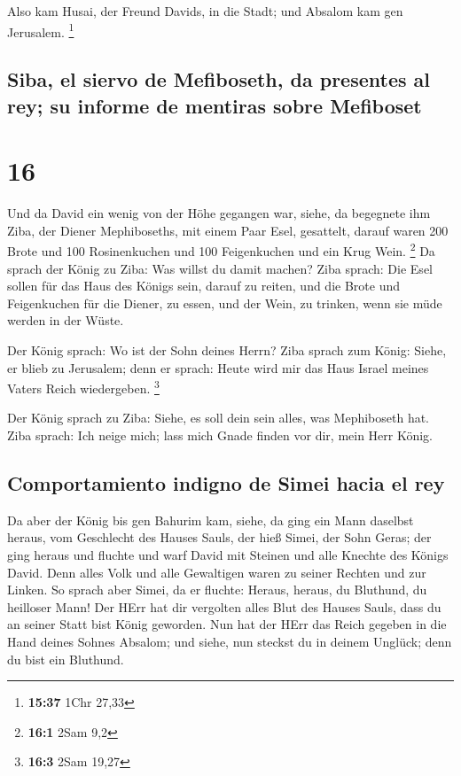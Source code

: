  Also kam Husai, der Freund Davids, in die Stadt; und
Absalom kam gen Jerusalem. \footnote{\textbf{15:37} 1Chr 27,33}

\hypertarget{siba-el-siervo-de-mefiboseth-da-presentes-al-rey-su-informe-de-mentiras-sobre-mefiboset}{%
\subsection{Siba, el siervo de Mefiboseth, da presentes al rey; su
informe de mentiras sobre
Mefiboset}\label{siba-el-siervo-de-mefiboseth-da-presentes-al-rey-su-informe-de-mentiras-sobre-mefiboset}}

\hypertarget{section-15}{%
\section{16}\label{section-15}}

 Und da David ein wenig von der Höhe gegangen war, siehe,
da begegnete ihm Ziba, der Diener Mephiboseths, mit einem Paar Esel,
gesattelt, darauf waren 200 Brote und 100 Rosinenkuchen und 100
Feigenkuchen und ein Krug Wein. \footnote{\textbf{16:1} 2Sam 9,2}
 Da sprach der König zu Ziba: Was willst du damit machen?
Ziba sprach: Die Esel sollen für das Haus des Königs sein, darauf zu
reiten, und die Brote und Feigenkuchen für die Diener, zu essen, und der
Wein, zu trinken, wenn sie müde werden in der Wüste.

 Der König sprach: Wo ist der Sohn deines Herrn? Ziba
sprach zum König: Siehe, er blieb zu Jerusalem; denn er sprach: Heute
wird mir das Haus Israel meines Vaters Reich wiedergeben. \footnote{\textbf{16:3}
  2Sam 19,27}

 Der König sprach zu Ziba: Siehe, es soll dein sein alles,
was Mephiboseth hat. Ziba sprach: Ich neige mich; lass mich Gnade finden
vor dir, mein Herr König.

\hypertarget{comportamiento-indigno-de-simei-hacia-el-rey}{%
\subsection{Comportamiento indigno de Simei hacia el
rey}\label{comportamiento-indigno-de-simei-hacia-el-rey}}

 Da aber der König bis gen Bahurim kam, siehe, da ging ein
Mann daselbst heraus, vom Geschlecht des Hauses Sauls, der hieß Simei,
der Sohn Geras; der ging heraus und fluchte  und warf
David mit Steinen und alle Knechte des Königs David. Denn alles Volk und
alle Gewaltigen waren zu seiner Rechten und zur Linken. 
So sprach aber Simei, da er fluchte: Heraus, heraus, du Bluthund, du
heilloser Mann!  Der HErr hat dir vergolten alles Blut des
Hauses Sauls, dass du an seiner Statt bist König geworden. Nun hat der
HErr das Reich gegeben in die Hand deines Sohnes Absalom; und siehe, nun
steckst du in deinem Unglück; denn du bist ein Bluthund.

